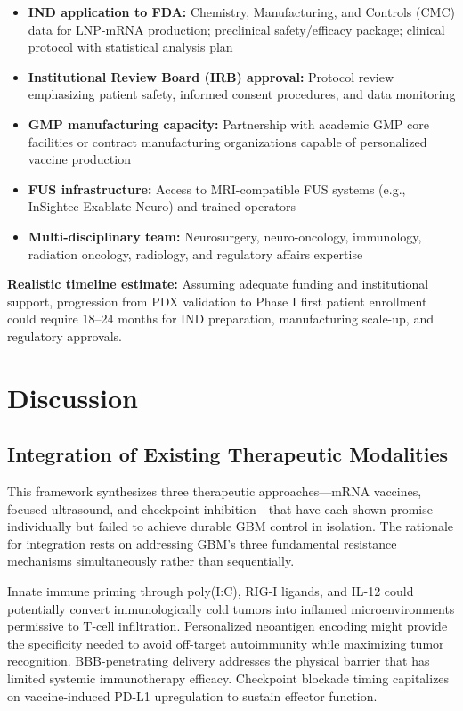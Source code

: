 \documentclass[12pt]{article}
\begin{document}
\begin{itemize}[leftmargin=*,noitemsep]
\item \textbf{IND application to FDA:} Chemistry, Manufacturing, and Controls (CMC) data for LNP-mRNA production; preclinical safety/efficacy package; clinical protocol with statistical analysis plan
\item \textbf{Institutional Review Board (IRB) approval:} Protocol review emphasizing patient safety, informed consent procedures, and data monitoring
\item \textbf{GMP manufacturing capacity:} Partnership with academic GMP core facilities or contract manufacturing organizations capable of personalized vaccine production
\item \textbf{FUS infrastructure:} Access to MRI-compatible FUS systems (e.g., InSightec Exablate Neuro) and trained operators
\item \textbf{Multi-disciplinary team:} Neurosurgery, neuro-oncology, immunology, radiation oncology, radiology, and regulatory affairs expertise
\end{itemize}

\textbf{Realistic timeline estimate:} Assuming adequate funding and institutional support, progression from PDX validation to Phase I first patient enrollment could require 18--24 months for IND preparation, manufacturing scale-up, and regulatory approvals.

\section{Discussion}

\subsection{Integration of Existing Therapeutic Modalities}
This framework synthesizes three therapeutic approaches—mRNA vaccines, focused ultrasound, and checkpoint inhibition—that have each shown promise individually but failed to achieve durable GBM control in isolation. The rationale for integration rests on addressing GBM's three fundamental resistance mechanisms simultaneously rather than sequentially.

Innate immune priming through poly(I:C), RIG-I ligands, and IL-12 could potentially convert immunologically cold tumors into inflamed microenvironments permissive to T-cell infiltration. Personalized neoantigen encoding might provide the specificity needed to avoid off-target autoimmunity while maximizing tumor recognition. BBB-penetrating delivery addresses the physical barrier that has limited systemic immunotherapy efficacy. Checkpoint blockade timing capitalizes on vaccine-induced PD-L1 upregulation to sustain effector function.
\end{document}
